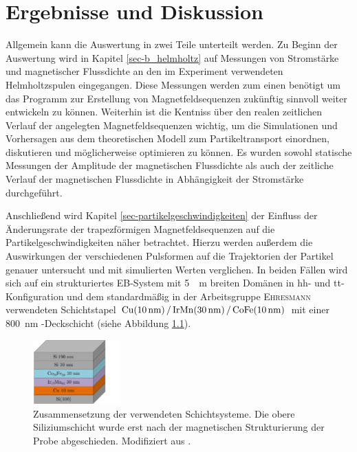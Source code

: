 \documentclass[page,pdftex,12pt,a4paper,twoside,openright]{scrbook}
\begin{document}
\chapter{Ergebnisse und Diskussion \label{sec-ergebnisse}}
\label{sec:orgad6d34e}
Allgemein kann die Auswertung in zwei Teile unterteilt werden.
Zu Beginn der Auswertung wird in Kapitel \ref{sec-b_helmholtz} auf Messungen von Stromstärke und magnetischer Flussdichte an den im Experiment verwendeten Helmholtzspulen eingegangen. Diese Messungen werden zum einen benötigt um das Programm zur Erstellung von Magnetfeldsequenzen zukünftig sinnvoll weiter entwickeln zu können. Weiterhin ist die Kentniss über den realen zeitlichen Verlauf der angelegten Magnetfeldsequenzen wichtig, um die Simulationen und Vorhersagen aus dem theoretischen Modell zum Partikeltransport einordnen, diskutieren und möglicherweise optimieren zu können. Es wurden sowohl statische Messungen der Amplitude der magnetischen Flussdichte als auch der zeitliche Verlauf der magnetischen Flussdichte in Abhängigkeit der Stromstärke durchgeführt.

Anschließend wird Kapitel \ref{sec-partikelgeschwindigkeiten} der Einfluss der Änderungsrate der trapezförmigen Magnetfeldsequenzen auf die Partikelgeschwindigkeiten näher betrachtet. Hierzu werden außerdem die Auswirkungen der verschiedenen Pulsformen auf die Trajektorien der Partikel genauer untersucht und mit simulierten Werten verglichen. In beiden Fällen wird sich auf ein strukturiertes EB-System mit \SI{5}{\mu\meter} breiten Domänen in hh- und tt-Konfiguration und dem standardmäßig in der Arbeitsgruppe \textsc{Ehresmann} verwendeten Schichtstapel \(\ce{ Cu(\SI{10}{\nano\meter}) / IrMn(\SI{30}{\nano\meter}) / CoFe(\SI{10}{\nano\meter}) }\) mit einer \SI{800}{\nano\meter} -Deckschicht (siehe Abbildung \ref{fig-layer}).

\begin{figure}[h]
\centering
\includegraphics[width=0.3\textwidth]{img/layer.png}
\caption{\label{fig-layer}
Zusammensetzung der verwendeten Schichtsysteme. Die obere Siliziumschicht wurde erst nach der magnetischen Strukturierung der Probe abgeschieden. Modifiziert aus \cite{janzen_fernsteuerbarer_2018}.}
\end{figure}
\end{document}
